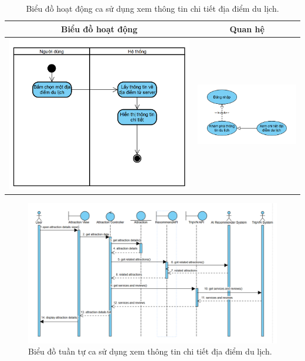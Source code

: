 \begin{table}[H] %
    \centering
    \caption{Biểu đồ hoạt động ca sử dụng xem thông tin chi tiết địa điểm du lịch.} %
    \label{tab:uc_view_place_details_diagrams} %
    \begin{tabular}{| c | c |}
        \hline
        \textbf{Biểu đồ hoạt động} & \textbf{Quan hệ} \\
        \hline
        \includegraphics[width=0.5\linewidth]{figures/c3/3-3-8-ad.png} %
        &
        \includegraphics[width=0.45\linewidth]{figures/c3/3-3-8-rd.png} \\ %
        \hline
    \end{tabular}
\end{table}

\begin{figure}[H]
    \centering
    \includegraphics[width=1\textwidth]{figures/c3/3-3-8-sd.png} %
    \caption{Biểu đồ tuần tự ca sử dụng xem thông tin chi tiết địa điểm du lịch.}
    \label{fig:3-3-8-sequence-diagram}
\end{figure}